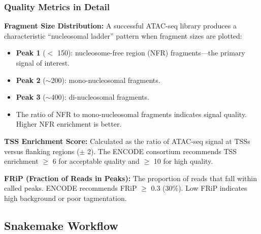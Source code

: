 \subsubsection{Quality Metrics in Detail}

\textbf{Fragment Size Distribution:} A successful ATAC-seq library produces a characteristic ``nucleosomal ladder'' pattern when fragment sizes are plotted:
\begin{itemize}[itemsep=1pt]
  \item \textbf{Peak 1} ($<$ 150\basepair{}): nucleosome-free region (NFR) fragments---the primary signal of interest.
  \item \textbf{Peak 2} ($\sim$200\basepair{}): mono-nucleosomal fragments.
  \item \textbf{Peak 3} ($\sim$400\basepair{}): di-nucleosomal fragments.
  \item The ratio of NFR to mono-nucleosomal fragments indicates signal quality. Higher NFR enrichment is better.
\end{itemize}

\textbf{TSS Enrichment Score:} Calculated as the ratio of ATAC-seq signal at TSSs versus flanking regions ($\pm$ 2\kilobase{}). The ENCODE consortium recommends TSS enrichment $\geq$ 6 for acceptable quality and $\geq$ 10 for high quality.

\textbf{FRiP (Fraction of Reads in Peaks):} The proportion of reads that fall within called peaks. ENCODE recommends FRiP $\geq$ 0.3 (30\%). Low FRiP indicates high background or poor tagmentation.

\subsection{Snakemake Workflow}
\label{subsec:chromatin:snakemake}


